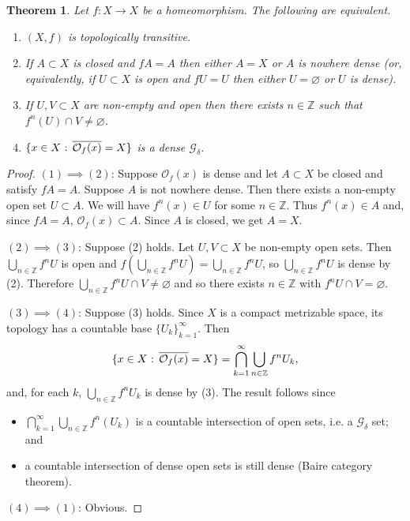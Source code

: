 \documentclass[12pt]{article}
\newtheorem{theorem}{Theorem}[section]
\theoremstyle{definition}
\theoremstyle{remark}
\begin{document}
\begin{theorem} \label{equiv_to_tt}
Let $f : X \to X$ be a homeomorphism.
The following are equivalent.
\begin{enumerate}
\item[(1)]
$(X,f)$ is topologically transitive.
\item[(2)]
If $A \subset X$ is closed and $fA=A$ then either $A=X$ or $A$ is nowhere dense (or,
equivalently, if $U \subset X$ is open and $fU=U$ then either $U = \varnothing$ or $U$ is dense).
\item[(3)]
If $U,V \subset X$ are non-empty and open then there exists $n \in \mathbb Z$ such that
$f^n(U) \cap V \ne \varnothing$.
\item[(4)]
$\{x \in X \hbox{ : } \overline{\mathcal O_f(x)}=X\}$ is a dense $\mathcal G_\delta$.
\end{enumerate}
\end{theorem}

\begin{proof}
$(1) \implies (2)$: Suppose $\mathcal O_f(x)$ is dense and let $A \subset X$ be closed and satisfy 
$fA=A$. Suppose $A$ is not nowhere dense. Then there exists a non-empty open set 
$U \subset A$. We will have $f^n(x) \in U$ for some $n \in \mathbb Z$. Thus $f^n(x) \in A$ and,
since $fA=A$, $\mathcal O_f(x) \subset A$. Since $A$ is closed, we get $A=X$.

\smallskip
\noindent
$(2) \implies (3)$: Suppose (2) holds. Let $U,V \subset X$ be non-empty open sets. Then
$\bigcup_{n \in \mathbb Z} f^nU$ is open and $f\left(\bigcup_{n \in \mathbb Z} f^nU\right)
=\bigcup_{n \in \mathbb Z} f^nU$, so $\bigcup_{n \in \mathbb Z} f^nU$ is dense by (2). Therefore 
$\bigcup_{n \in \mathbb Z} f^nU \cap V \ne \varnothing$ and so there exists $n \in \mathbb Z$ with 
$f^nU \cap V= \varnothing$.

\smallskip
\noindent
$(3) \implies (4)$: Suppose (3) holds. 
Since $X$ is a compact metrizable space, its topology has a countable base $\{U_k\}_{k=1}^\infty$.
Then
\[
\{x \in X \hbox{ : } \overline{\mathcal O_f(x)}=X\}
= \bigcap_{k=1}^\infty \bigcup_{n \in \mathbb Z} f^nU_k,
 \]
 and, for each $k$, $\bigcup_{n \in \mathbb Z} f^nU_k$ is dense by (3). The result follows
 since
 \begin{itemize}
 \item $\bigcap_{k=1}^\infty \bigcup_{n \in \mathbb Z} f^n(U_k)$ is a countable intersection of open sets, i.e. a $\mathcal G_\delta$ set; and
 \item
 a countable intersection of dense open sets is still dense (Baire category theorem).
\end{itemize}
 
 \smallskip
 \noindent
 $(4) \implies (1)$: Obvious.
\end{proof}
\end{document}
